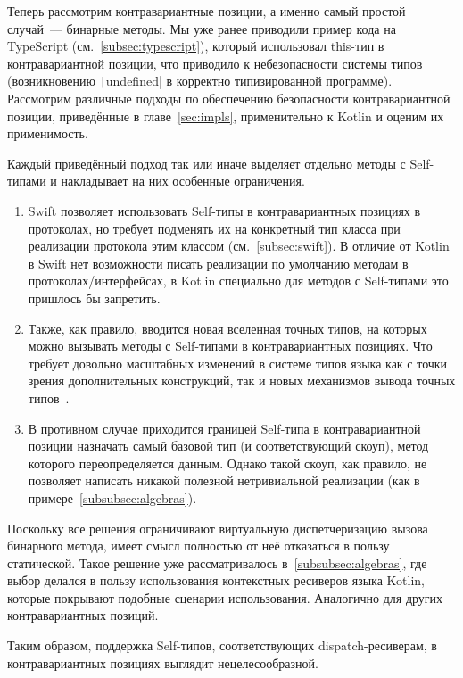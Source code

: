 Теперь рассмотрим контравариантные позиции, а именно самый простой случай~--- бинарные методы.
Мы уже ранее приводили пример кода на TypeScript (см.~\ref{subsec:typescript}), который использовал this-тип в контравариантной позиции, что приводило к небезопасности системы типов (возникновению \texttt|undefined| в корректно типизированной программе).
Рассмотрим различные подходы по обеспечению безопасности контравариантной позиции, приведённые в главе~\ref{sec:impls}, применительно к Kotlin и оценим их применимость.

Каждый приведённый подход так или иначе выделяет отдельно методы с Self-типами и накладывает на них особенные ограничения.

\begin{enumerate}
    \item Swift позволяет использовать Self-типы в контравариантных позициях в протоколах, но требует подменять их на конкретный тип класса при реализации протокола этим классом (см.~\ref{subsec:swift}).
    В отличие от Kotlin в Swift нет возможности писать реализации по умолчанию методам в протоколах/интерфейсах, в Kotlin специально для методов с Self-типами это пришлось бы запретить.
    \item Также, как правило, вводится новая вселенная точных типов, на которых можно вызывать методы с Self-типами в контравариантных позициях.
    Что требует довольно масштабных изменений в системе типов языка как с точки зрения дополнительных конструкций, так и новых механизмов вывода точных типов~\cite{ryu2016thistype}.
    \item В противном случае приходится границей Self-типа в контравариантной позиции назначать самый базовой тип (и соответствующий скоуп), метод которого переопределяется данным.
    Однако такой скоуп, как правило, не позволяет написать никакой полезной нетривиальной реализации (как в примере~\ref{subsubsec:algebras}).
\end{enumerate}

Поскольку все решения ограничивают виртуальную диспетчеризацию вызова бинарного метода, имеет смысл полностью от неё отказаться в пользу статической.
Такое решение уже рассматривалось в~\ref{subsubsec:algebras}, где выбор делался в пользу использования контекстных ресиверов языка Kotlin, которые покрывают подобные сценарии использования.
Аналогично для других контравариантных позиций.

Таким образом, поддержка Self-типов, соответствующих dispatch-ресиверам, в контравариантных позициях выглядит нецелесообразной.

